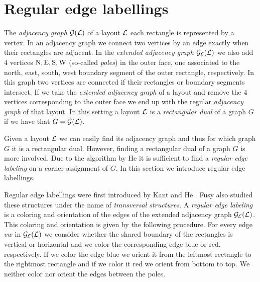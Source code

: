 
\section{Regular edge labellings}
\label{s:rel}
\thispagestyle{plain}
  The \emph{adjacency graph} $\mathcal{G}(\mathcal{L})$ of a layout $\mathcal{L}$ each rectangle is represented by a vertex. In an adjacency graph we connect two vertices by an edge exactly when their rectangles are adjacent.
  In the \emph{extended adjacency graph} $\mathcal{G}_{\mathcal{E}}(\mathcal{L})$ we also add $4$ vertices $\mathrm{N}, \mathrm{E}, \mathrm{S}, \mathrm{W}$ (so-called \emph{poles}) in the outer face, one associated to the north, east, south, west boundary segment of the outer rectangle, respectively.
  In this graph two vertices are connected if their rectangles or boundary segments intersect.
  If we take the \emph{extended adjacency graph} of a layout and remove the $4$ vertices corresponding to the outer face we end up with the regular \emph{adjacency graph} of that layout.
  In this setting a layout $\mathcal{L}$ is a \emph{rectangular dual} of a graph $G$ if we have that $G = \mathcal{G}(\mathcal{L})$.



  Given a layout $\mathcal{L}$ we can easily find its adjacency graph and thus for which graph $G$ it is a rectangular dual. However, finding a rectangular dual of a graph $G$ is more involved. Due to the algorithm by He \cite{He1993} it is sufficient to find a \emph{regular edge labeling} on a corner assignment of $G$. In this section we introduce regular edge labellings.

  Regular edge labellings were first introduced by Kant and He \cite{Kant1997}.
  Fusy also studied these structures \cite{Fusy2009, Fusy2006} under the name of \emph{transversal structures}.
  A \emph{regular edge labeling} is a coloring and orientation of the edges of the extended adjacency graph $\mathcal{G}_{\mathcal{E}}(\mathcal{L})$.
  This coloring and orientation is given by the following procedure.
  For every edge $vw$ in $\mathcal{G}_{\mathcal{E}}(\mathcal{L})$ we consider whether the shared boundary of the rectangles is vertical or horizontal and we color the corresponding edge blue or red, respectively.
  If we color the edge blue we orient it from the leftmost rectangle to the rightmost rectangle and if we color it red we orient from bottom to top.
  We neither color nor orient the edges between the poles.

